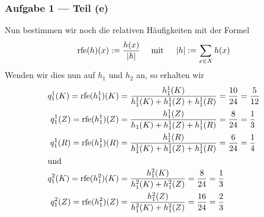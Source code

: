 \documentclass{beamer}
\DeclareMathOperator{\rfe}{rfe}
\begin{document}
\begin{frame} \frametitle{Aufgabe 1 --- Teil (e)}
	\justifying \footnotesize
	Nun bestimmen wir noch die relativen Häufigkeiten mit der Formel
	\begin{equation*}
		\rfe(h)(x) \defeq \frac{h(x)}{\abs{h}} \quad \mit \quad \abs{h} \defeq \sum_{x \in X} h(x)
	\end{equation*}
	\pause
	Wenden wir dies nun auf $h_1$ und $h_2$ an, so erhalten wir
	\begin{align*}
		q_1^1(K) = \rfe(h_1^1)(K) &= \frac{h_1^1(K)}{h_1^1(K) + h_1^1(Z) + h_1^1(R)} = \frac{10}{24} = \frac{5}{12} \\
		q_1^1(Z) = \rfe(h_1^1)(Z) &= \frac{h_1^1(Z)}{h_1(K) + h_1^1(Z) + h_1^1(R)} = \frac{8}{24} = \frac{1}{3} \\
		q_1^1(R) = \rfe(h_1^1)(R) &= \frac{h_1^1(R)}{h_1^1(K) + h_1^1(Z) + h_1^1(R)} = \frac{6}{24} = \frac{1}{4} \\
		\intertext{und}
		q_1^2(K) = \rfe(h_1^2)(K) &= \frac{h_1^2(K)}{h_1^2(K) + h_1^2(Z)} = \frac{8}{24} = \frac{1}{3} \\
		q_1^2(Z) = \rfe(h_1^2)(Z) &= \frac{h_1^2(Z)}{h_1^2(K) + h_1^2(Z)} = \frac{16}{24} = \frac{2}{3} \\
	\end{align*}
\end{frame}
\end{document}
